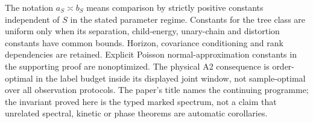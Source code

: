 The notation $a_S\asymp b_S$ means comparison by strictly positive
constants independent of $S$ in the stated parameter regime. Constants
for the tree class are uniform only when its separation, child-energy,
unary-chain and distortion constants have common bounds. Horizon,
covariance conditioning and rank dependencies are retained. Explicit
Poisson normal-approximation constants in the supporting proof are
nonoptimized. The physical A2 consequence is order-optimal in the label
budget inside its displayed joint window, not sample-optimal over all
observation protocols. The paper's title names the continuing programme;
the invariant proved here is the typed marked spectrum, not a claim that
unrelated spectral, kinetic or phase theorems are automatic corollaries.
